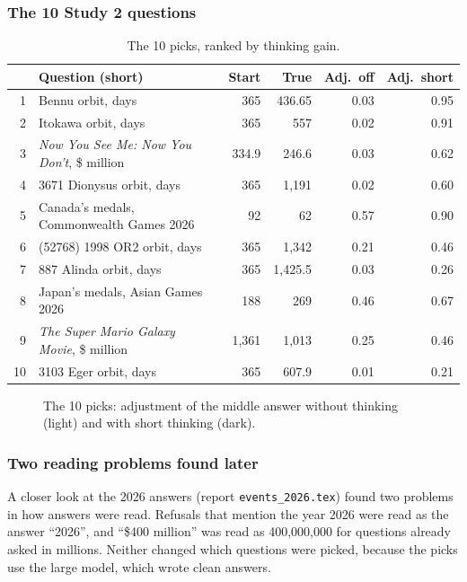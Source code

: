 \documentclass[11pt,a4paper]{article}
\begin{document}
\subsubsection{The 10 Study 2 questions}
\begin{table}[ht]
\centering\small
\begin{tabular}{@{}rlrrrr@{}}
\toprule
& Question (short) & Start & True & Adj.\ off & Adj.\ short \\
\midrule
1 & Bennu orbit, days & 365 & 436.65 & 0.03 & 0.95 \\
2 & Itokawa orbit, days & 365 & 557 & 0.02 & 0.91 \\
3 & \emph{Now You See Me: Now You Don't}, \$ million & 334.9 & 246.6 & 0.03 & 0.62 \\
4 & 3671 Dionysus orbit, days & 365 & 1,191 & 0.02 & 0.60 \\
5 & Canada's medals, Commonwealth Games 2026 & 92 & 62 & 0.57 & 0.90 \\
6 & (52768) 1998 OR2 orbit, days & 365 & 1,342 & 0.21 & 0.46 \\
7 & 887 Alinda orbit, days & 365 & 1,425.5 & 0.03 & 0.26 \\
8 & Japan's medals, Asian Games 2026 & 188 & 269 & 0.46 & 0.67 \\
9 & \emph{The Super Mario Galaxy Movie}, \$ million & 1,361 & 1,013 & 0.25 & 0.46 \\
10 & 3103 Eger orbit, days & 365 & 607.9 & 0.01 & 0.21 \\
\bottomrule
\end{tabular}
\caption{The 10 picks, ranked by thinking gain.}
\end{table}

\begin{figure}[ht]
\centering{}
\caption{The 10 picks: adjustment of the middle answer without thinking (light) and with short thinking (dark).}
\end{figure}

\FloatBarrier
\subsubsection{Two reading problems found later}
A closer look at the 2026 answers (report \texttt{events\_2026.tex}) found two problems in how answers were read. Refusals that mention the year 2026 were read as the answer \enquote{2026}, and \enquote{\$400 million} was read as 400,000,000 for questions already asked in millions. Neither changed which questions were picked, because the picks use the large model, which wrote clean answers.
\end{document}
